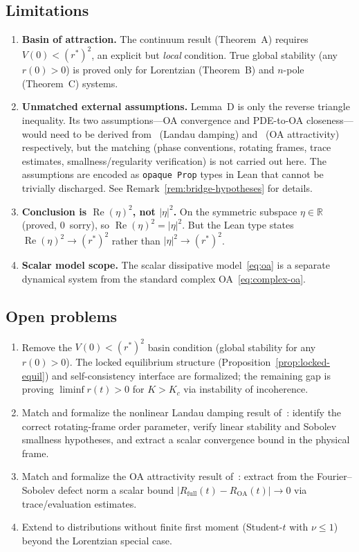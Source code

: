 \documentclass[11pt,a4paper]{article}
\theoremstyle{definition}
\DeclareMathOperator{\re}{Re}
\newcommand{\R}{\mathbb{R}}
\begin{document}
\subsection{Limitations}

\begin{enumerate}
\item \textbf{Basin of attraction.} The continuum result (Theorem~A) requires $V(0) < (r^*)^2$, an explicit but \emph{local} condition. True global stability (any $r(0) > 0$) is proved only for Lorentzian (Theorem~B) and $n$-pole (Theorem~C) systems.

\item \textbf{Unmatched external assumptions.} Lemma~D is only the reverse triangle inequality. Its two assumptions---OA convergence and PDE-to-OA closeness---would need to be derived from~\cite{dietert2017} (Landau damping) and~\cite{dietert-fernandez2018,engelbrecht2020} (OA attractivity) respectively, but the matching (phase conventions, rotating frames, trace estimates, smallness/regularity verification) is not carried out here. The assumptions are encoded as \texttt{opaque Prop} types in Lean that cannot be trivially discharged. See Remark~\ref{rem:bridge-hypotheses} for details.

\item \textbf{Conclusion is $\re(\eta)^2$, not $|\eta|^2$.} On the symmetric subspace $\eta \in \R$ (proved, 0~sorry), so $\re(\eta)^2 = |\eta|^2$. But the Lean type states $\re(\eta)^2 \to (r^*)^2$ rather than $|\eta|^2 \to (r^*)^2$.

\item \textbf{Scalar model scope.} The scalar dissipative model~\eqref{eq:oa} is a separate dynamical system from the standard complex OA~\eqref{eq:complex-oa}.
\end{enumerate}

\subsection{Open problems}

\begin{enumerate}
\item Remove the $V(0) < (r^*)^2$ basin condition (global stability for any $r(0) > 0$). The locked equilibrium structure (Proposition~\ref{prop:locked-equil}) and self-consistency interface are formalized; the remaining gap is proving $\liminf r(t) > 0$ for $K > K_c$ via instability of incoherence.
\item Match and formalize the nonlinear Landau damping result of~\cite{dietert2017}: identify the correct rotating-frame order parameter, verify linear stability and Sobolev smallness hypotheses, and extract a scalar convergence bound in the physical frame.
\item Match and formalize the OA attractivity result of~\cite{dietert-fernandez2018}: extract from the Fourier--Sobolev defect norm a scalar bound $|R_{\mathrm{full}}(t) - R_{\mathrm{OA}}(t)| \to 0$ via trace/evaluation estimates.
\item Extend to distributions without finite first moment (Student-$t$ with $\nu \leq 1$) beyond the Lorentzian special case.
\end{enumerate}
\end{document}
